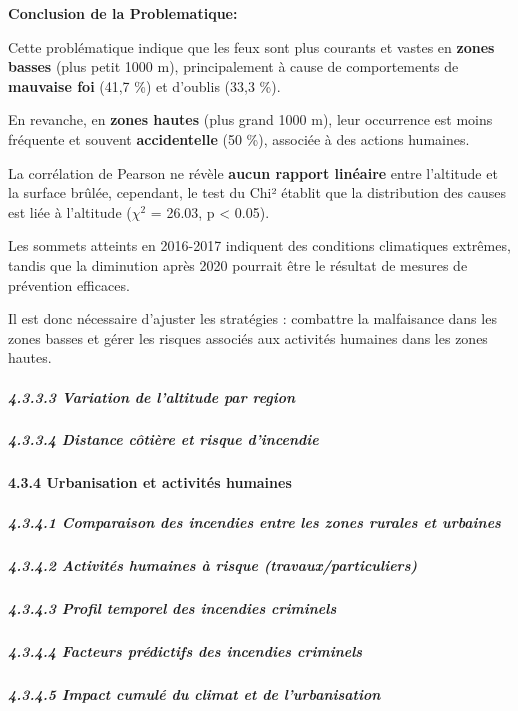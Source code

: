 \documentclass[
]{article}
\begin{document}
\textbf{Conclusion de la Problematique:}

Cette problématique indique que les feux sont plus courants et vastes en
\textbf{zones basses} (plus petit 1000 m), principalement à cause de
comportements de \textbf{mauvaise foi} (41,7 \%) et d'oublis (33,3 \%).

En revanche, en \textbf{zones hautes} (plus grand 1000 m), leur
occurrence est moins fréquente et souvent \textbf{accidentelle} (50 \%),
associée à des actions humaines.

La corrélation de Pearson ne révèle \textbf{aucun rapport linéaire}
entre l'altitude et la surface brûlée, cependant, le test du Chi²
établit que la distribution des causes est liée à l'altitude (\(\chi^2\)
= 26.03, p \textless{} 0.05).

Les sommets atteints en 2016-2017 indiquent des conditions climatiques
extrêmes, tandis que la diminution après 2020 pourrait être le résultat
de mesures de prévention efficaces.

Il est donc nécessaire d'ajuster les stratégies : combattre la
malfaisance dans les zones basses et gérer les risques associés aux
activités humaines dans les zones hautes.

\subparagraph{4.3.3.3 Variation de l'altitude par
region}\label{variation-de-laltitude-par-region}

\subparagraph{4.3.3.4 Distance côtière et risque
d'incendie}\label{distance-cuxf4tiuxe8re-et-risque-dincendie}

\paragraph{4.3.4 Urbanisation et activités
humaines}\label{urbanisation-et-activituxe9s-humaines}

\subparagraph{4.3.4.1 Comparaison des incendies entre les zones rurales
et
urbaines}\label{comparaison-des-incendies-entre-les-zones-rurales-et-urbaines}

\subparagraph{4.3.4.2 Activités humaines à risque
(travaux/particuliers)}\label{activituxe9s-humaines-uxe0-risque-travauxparticuliers}

\subparagraph{4.3.4.3 Profil temporel des incendies
criminels}\label{profil-temporel-des-incendies-criminels}

\subparagraph{4.3.4.4 Facteurs prédictifs des incendies
criminels}\label{facteurs-pruxe9dictifs-des-incendies-criminels}

\subparagraph{4.3.4.5 Impact cumulé du climat et de
l'urbanisation}\label{impact-cumuluxe9-du-climat-et-de-lurbanisation}
\end{document}
